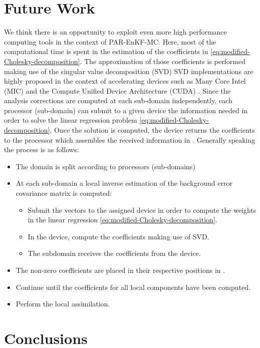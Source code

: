 \documentclass[12pt]{article}
\begin{document}
\section{Future Work}
\label{sec:future-work}
We think there is an opportunity to exploit even more high performance computing tools in the context of PAR-EnKF-MC. Here, most of the computational time is spent in the estimation of the coefficients in \eqref{eq:modified-Cholesky-decomposition}. The approximation of those coefficients is performed making use of the singular value decomposition (SVD) SVD implementations are highly proposed in the context of accelerating devices such as Many Core Intel (MIC) \cite{Huang13042015} and the Compute Unified Device Architecture (CUDA) \cite{Lahbar5161058}. Since the analysis corrections are computed at each sub-domain independently, each processor (sub-domain) can submit to a given device the information needed in order to solve the linear regression problem \eqref{eq:modified-Cholesky-decomposition}. Once the solution is computed, the device returns the coefficients to the processor which assembles the received information in . Generally speaking the process is as follows:
\begin{itemize}
\item The domain is split according to  processors (sub-domains)
\item At each sub-domain a local inverse estimation of the background error covariance matrix is computed:
\begin{itemize}
\item Submit the vectors  to the assigned device in order to compute the weights in the linear regression \eqref{eq:modified-Cholesky-decomposition}.
\item In the device, compute the coefficients making use of SVD.
\item The subdomain receives the coefficients from the device.
\end{itemize}
\item The non-zero coefficients are placed in their respective positions in .
\item Continue until the coefficients for all local components have been computed.
\item Perform the local assimilation.
\end{itemize}

\section{Conclusions}
\label{sec:conclusions}
\end{document}
